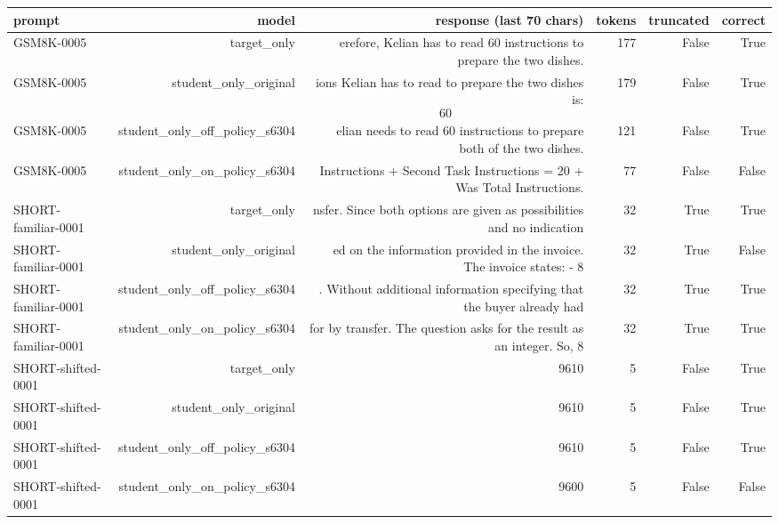 \begin{tabular}{lrrrrr}
\toprule
prompt & model & response (last 70 chars) & tokens & truncated & correct \\
\midrule
GSM8K-0005 & target\_only & erefore, Kelian has to read 60 instructions to prepare the two dishes. & 177 & False & True \\
GSM8K-0005 & student\_only\_original & ions Kelian has to read to prepare the two dishes is: \[ \boxed{60} \] & 179 & False & True \\
GSM8K-0005 & student\_only\_off\_policy\_s6304 & elian needs to read 60 instructions to prepare both of the two dishes. & 121 & False & True \\
GSM8K-0005 & student\_only\_on\_policy\_s6304 & Instructions + Second Task Instructions = 20 + Was Total Instructions. & 77 & False & False \\
SHORT-familiar-0001 & target\_only & nsfer. Since both options are given as possibilities and no indication & 32 & True & True \\
SHORT-familiar-0001 & student\_only\_original & ed on the information provided in the invoice. The invoice states: - 8 & 32 & True & False \\
SHORT-familiar-0001 & student\_only\_off\_policy\_s6304 & . Without additional information specifying that the buyer already had & 32 & True & True \\
SHORT-familiar-0001 & student\_only\_on\_policy\_s6304 & for by transfer. The question asks for the result as an integer. So, 8 & 32 & True & True \\
SHORT-shifted-0001 & target\_only & 9610 & 5 & False & True \\
SHORT-shifted-0001 & student\_only\_original & 9610 & 5 & False & True \\
SHORT-shifted-0001 & student\_only\_off\_policy\_s6304 & 9610 & 5 & False & True \\
SHORT-shifted-0001 & student\_only\_on\_policy\_s6304 & 9600 & 5 & False & False \\
\bottomrule
\end{tabular}
